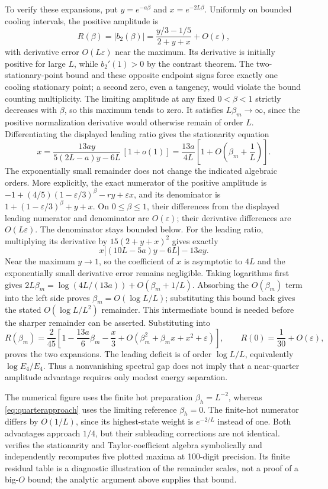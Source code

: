 \documentclass[11pt]{article}
\begin{document}
To verify these expansions, put $y=e^{-a\beta}$ and $x=e^{-2L\beta}$.
Uniformly on bounded cooling intervals, the positive amplitude is
\[
R(\beta)=|b_2(\beta)|
=\frac{y/3-1/5}{2+y+x}+O(\varepsilon),
\]
with derivative error $O(L\varepsilon)$ near the maximum. Its derivative is
initially positive for large $L$, while $b_2'(1)>0$ by the contrast theorem.
The two-stationary-point bound and these opposite endpoint signs force exactly
one cooling stationary point; a second zero, even a tangency, would violate
the bound counting multiplicity. The limiting amplitude at any fixed
$0<\beta<1$ strictly decreases with $\beta$, so this maximum tends to zero.
It satisfies $L\beta_m\to\infty$, since the positive normalization derivative
would otherwise remain of order $L$. Differentiating the displayed leading
ratio gives the stationarity equation
\[
x=\frac{13ay}{5(2L-a)y-6L}\,[1+o(1)]
=\frac{13a}{4L}\left[1+O\!\left(\beta_m+\frac1L\right)\right].
\]
The exponentially small remainder does not change the indicated algebraic
orders. More explicitly, the exact numerator of the positive amplitude is
$-1+(4/5)(1-\varepsilon/3)^\beta-r y+\varepsilon x$,
and its denominator is $1+(1-\varepsilon/3)^\beta+y+x$.
On $0\leq\beta\leq1$, their differences from the displayed leading
numerator and denominator are $O(\varepsilon)$; their derivative
differences are $O(L\varepsilon)$. The denominator stays bounded below.
For the leading ratio, multiplying its derivative by $15(2+y+x)^2$
gives exactly
\[
x\bigl[(10L-5a)y-6L\bigr]-13ay.
\]
Near the maximum $y\to1$, so the coefficient of $x$ is asymptotic to
$4L$ and the exponentially small derivative error remains negligible.
Taking logarithms first gives
$2L\beta_m=\log(4L/(13a))+O(\beta_m+1/L)$.
Absorbing the $O(\beta_m)$ term into the left side proves
$\beta_m=O(\log L/L)$; substituting this bound back gives the stated
$O(\log L/L^2)$ remainder. This intermediate bound is needed before
the sharper remainder can be asserted. Substituting into
\[
R(\beta_m)=\frac2{45}
\left[1-\frac{13a}{6}\beta_m-\frac{x}{3}
+O(\beta_m^2+\beta_m x+x^2+\varepsilon)\right],
\qquad R(0)=\frac1{30}+O(\varepsilon),
\]
proves the two expansions. The leading deficit is of order
$\log L/L$, equivalently $\log E_4/E_4$. Thus a nonvanishing spectral gap
does not imply that a near-quarter amplitude advantage requires only modest
energy separation.

The numerical figure uses the finite hot preparation $\beta_h=L^{-2}$,
whereas \eqref{eq:quarterapproach} uses the limiting reference $\beta_h=0$.
The finite-hot numerator differs by $O(1/L)$, since its highest-state
weight is $e^{-2/L}$ instead of one. Both advantages approach $1/4$,
but their subleading corrections are not identical.
 verifies the stationarity and
Taylor-coefficient algebra symbolically and independently recomputes five
plotted maxima at 100-digit precision. Its finite residual table is a
diagnostic illustration of the remainder scales, not a proof of a big-$O$
bound; the analytic argument above supplies that bound.
\end{document}
